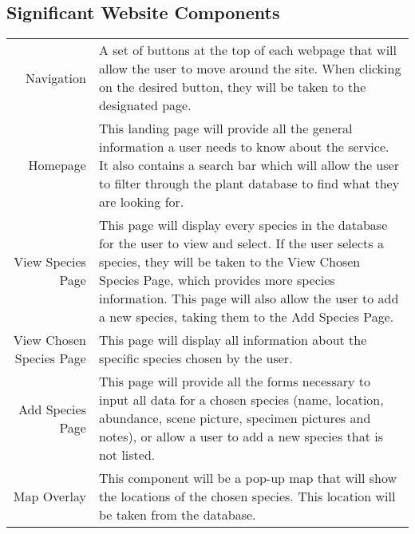 \subsection{Significant Website Components}
	\begin{tabular}{r p{10cm}}
	Navigation & A set of buttons at the top of each webpage that will allow the user to move around the site. When clicking on the desired button, they will be taken to the designated page.\\

	Homepage & This landing page will provide all the general information a user needs to know about the service. It also contains a search bar which will allow the user to filter through the plant database to find what they are looking for. \\

	View Species Page & This page will display every species in the database for the user to view and select. If the user selects a species, they will be taken to the View Chosen Species Page, which provides more species information. This page will also allow the user to add a new species, taking them to the Add Species Page. \\

	View Chosen Species Page & This page will display all information about the specific species chosen by the user. \\

	Add Species Page & This page will provide all the forms necessary to input all data for a chosen species (name, location, abundance, scene picture, specimen pictures and notes), or allow a user to add a new species that is not listed. \\

	Map Overlay & This component will be a pop-up map that will show the locations of the chosen species. This location will be taken from the database.\\
	\end{tabular}

\clearpage
